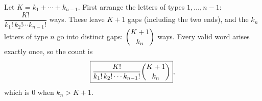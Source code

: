 Let $K=k_1+\cdots+k_{n-1}$. First arrange the letters of types $1,\dots,n-1$: $\dfrac{K!}{k_1!\,k_2!\cdots k_{n-1}!}$ ways. These leave $K+1$ gaps (including the two ends), and the $k_n$ letters of type $n$ go into distinct gaps: $\dbinom{K+1}{k_n}$ ways. Every valid word arises exactly once, so the count is
\[\boxed{\dfrac{K!}{k_1!\,k_2!\cdots k_{n-1}!}\dbinom{K+1}{k_n}},\]
which is $0$ when $k_n>K+1$.
